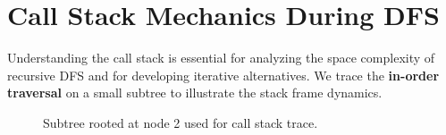 \documentclass[10pt,journal,compsoc,onecolumn]{IEEEtran}
\begin{document}
\section{Call Stack Mechanics During DFS}
\label{sec:callstack}

Understanding the call stack is essential for analyzing the space complexity of recursive DFS and for developing iterative alternatives. We trace the \textbf{in-order traversal} on a small subtree to illustrate the stack frame dynamics.

\begin{figure}[htbp]
\centering
{}
\caption{Subtree rooted at node 2 used for call stack trace.}
\label{fig:subtree_trace}
\end{figure}
\end{document}
